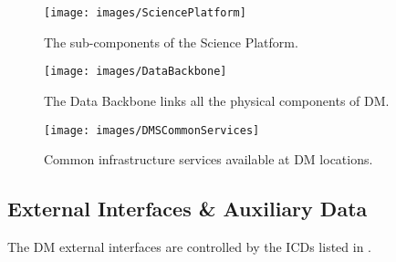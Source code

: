 \begin{figure}[htbp]
\begin{center}
\texttt{[image: images/SciencePlatform]}
\caption{The sub-components of the \gls{Science Platform}. \label{fig:sciplat}}
\end{center}
\end{figure}


\begin{figure}[htbp]
\begin{center}
\texttt{[image: images/DataBackbone]}
\caption{The \gls{Data Backbone} links all the physical components of \gls{DM}. \label{fig:databb}}
\end{center}
\end{figure}

\begin{figure}[htbp]
\begin{center}
 \texttt{[image: images/DMSCommonServices]}
\caption{Common infrastructure services available at \gls{DM} locations. \label{fig:dcs}}
\end{center}
\end{figure}



\subsection{External Interfaces \& Auxiliary Data}
The \gls{DM} external interfaces are controlled by the ICDs listed in .

